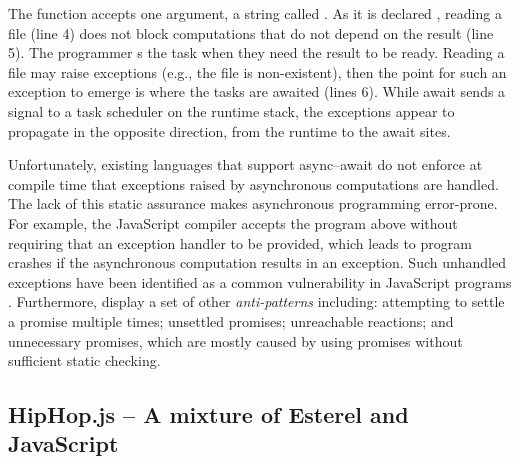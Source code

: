 \documentclass[acmsmall,review,anonymous]{acmart}\settopmatter{printfolios=true,printccs=false,printacmref=false}
\begin{document}
The function {} accepts one argument, a string called {}. As it is declared {\textbf{\color{blue}}}, reading a file (line 4) does not block computations that do not depend on the result (line 5). The programmer {\textbf{\color{blue}}}s the task when they need the result to be ready. Reading a file may raise exceptions (e.g., the file is non-existent), then the point for such an exception to emerge is where the tasks are awaited (lines 6). While await sends a signal to a task scheduler on the runtime stack, the exceptions appear to propagate in the opposite direction, from the runtime to the await sites.

Unfortunately, existing languages that support async–await do not enforce at compile time that exceptions raised by asynchronous computations are handled. The lack of this static assurance makes asynchronous programming error-prone. For example, the JavaScript compiler accepts the program above without requiring that an exception handler to be provided, which leads to program crashes if the asynchronous computation results in an exception. 
Such unhandled exceptions have been identified as a common vulnerability in JavaScript programs \cite{madsen2017model,alimadadi2018finding}.
Furthermore, \cite{madsen2017model,alimadadi2018finding} display a set of other \emph{anti-patterns} including: 
attempting to settle a promise multiple times; unsettled promises; unreachable reactions; 
and unnecessary promises, which are mostly caused by using promises without sufficient static checking. 






   \vspace{2mm}
\subsection{HipHop.js -- A mixture of Esterel and JavaScript}
\label{subsection:HipHop}
\end{document}
